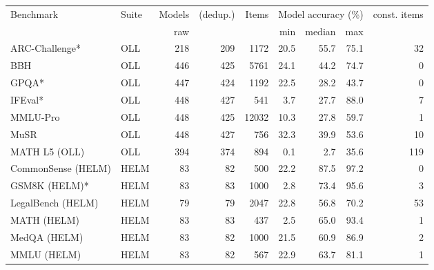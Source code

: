 \begin{tabular}{llrrrrrrr}
\toprule
Benchmark & Suite & Models & (dedup.) & Items & \multicolumn{3}{c}{Model accuracy (\%)} & const. items \\
 & & raw & & & min & median & max & \\
\midrule
ARC-Challenge* & OLL & 218 & 209 & 1172 & 20.5 & 55.7 & 75.1 & 32 \\
BBH & OLL & 446 & 425 & 5761 & 24.1 & 44.2 & 74.7 & 0 \\
GPQA* & OLL & 447 & 424 & 1192 & 22.5 & 28.2 & 43.7 & 0 \\
IFEval* & OLL & 448 & 427 & 541 & 3.7 & 27.7 & 88.0 & 7 \\
MMLU-Pro & OLL & 448 & 425 & 12032 & 10.3 & 27.8 & 59.7 & 1 \\
MuSR & OLL & 448 & 427 & 756 & 32.3 & 39.9 & 53.6 & 10 \\
MATH L5 (OLL) & OLL & 394 & 374 & 894 & 0.1 & 2.7 & 35.6 & 119 \\
CommonSense (HELM) & HELM & 83 & 82 & 500 & 22.2 & 87.5 & 97.2 & 0 \\
GSM8K (HELM)* & HELM & 83 & 83 & 1000 & 2.8 & 73.4 & 95.6 & 3 \\
LegalBench (HELM) & HELM & 79 & 79 & 2047 & 22.8 & 56.8 & 70.2 & 53 \\
MATH (HELM) & HELM & 83 & 83 & 437 & 2.5 & 65.0 & 93.4 & 1 \\
MedQA (HELM) & HELM & 83 & 82 & 1000 & 21.5 & 60.9 & 86.9 & 2 \\
MMLU (HELM) & HELM & 83 & 82 & 567 & 22.9 & 63.7 & 81.1 & 1 \\
\bottomrule
\end{tabular}
